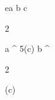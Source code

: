 \begin{eqcode}{e}{a }{}{}
  b \in {} \lend
  c \gets
  \begin{tmatrix}
  2  \lend
  \end{tmatrix} \lend
  a \gets \genar \limits ^ {5}(c) \lend %
  b \gets \genar \limits ^ {  \begin{tmatrix}
  2  \lend
  \end{tmatrix} }(c) \lend 
\end{eqcode}
